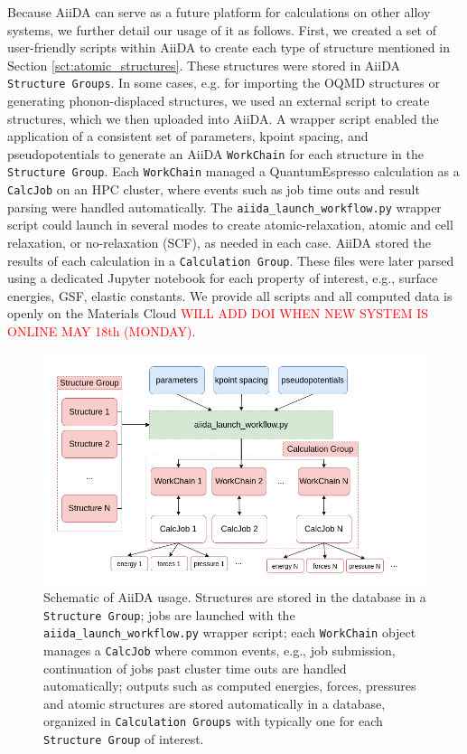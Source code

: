 \documentclass{article}
\begin{document}
Because AiiDA can serve as a future platform for calculations on other alloy systems, we further detail our usage of it as follows.
First, we created a set of user-friendly scripts within AiiDA to create each type of structure mentioned in Section \ref{sct:atomic_structures}.
These structures were stored in AiiDA \texttt{Structure Groups}.
In some cases, e.g. for importing the OQMD structures or generating phonon-displaced structures, we used an external script to create structures, which we then uploaded into AiiDA.
A wrapper script enabled the application of a consistent set of parameters, kpoint spacing, and pseudopotentials to generate an AiiDA \texttt{WorkChain} for each structure in the \texttt{Structure Group}.
Each \texttt{WorkChain} managed a QuantumEspresso calculation as a \texttt{CalcJob} on an HPC cluster, 
where events such as job time outs and result parsing were handled automatically.
The \texttt{aiida_launch_workflow.py} wrapper script could launch in several modes to create atomic-relaxation, atomic and cell relaxation, or no-relaxation (SCF), as needed in each case.
AiiDA stored the results of each calculation in a \texttt{Calculation Group}.  These files were later parsed using a dedicated Jupyter\cite{Kluyver2016} notebook for each property of interest, e.g., surface energies, GSF, elastic constants. 
We provide all scripts and all computed data is openly on the Materials Cloud\cite{Talirz2020MaterialsScience} \textcolor{red}{WILL ADD DOI WHEN NEW SYSTEM IS ONLINE MAY 18th (MONDAY)}.


\begin{figure}[H]%
\centering%
\includegraphics[width=1.0\textwidth,center]{figures/recalculateDBschematic.png}%
\caption{Schematic of AiiDA usage.  Structures are stored in the database in a \lstinline{Structure Group}; jobs are launched with the \lstinline{aiida_launch_workflow.py} wrapper script; each \lstinline{WorkChain} object manages a \lstinline{CalcJob} where common events, e.g., job submission, continuation of jobs past cluster time outs are handled automatically; outputs such as computed energies, forces, pressures and atomic structures are stored automatically in a database, organized in \lstinline{Calculation Groups} with typically one
for each \lstinline{Structure Group} of interest.
}
\label{fig:aiida_methods}
\end{figure}
\end{document}
